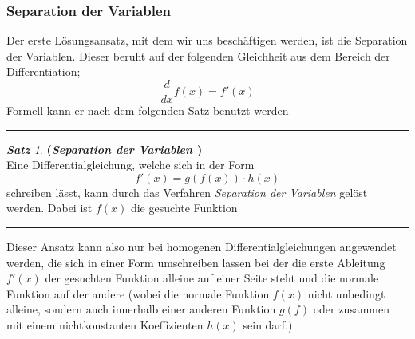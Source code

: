 \documentclass[a4paper,11pt]{article}
\theoremstyle{remark}
\newtheorem{sentence}{\textbf{Satz}}[section]
\begin{document}
\subsubsection{Separation der Variablen}
Der erste Lösungsansatz, mit dem wir uns beschäftigen werden, ist die Separation der Variablen. Dieser beruht auf der folgenden Gleichheit aus dem Bereich der Differentiation;
\begin{equation}
\frac{d}{dx}f(x)=f'(x)
\end{equation}
Formell kann er nach dem folgenden Satz benutzt werden
\begin{center}
\begin{flushleft}
\rule{8cm}{0,01cm}
\end{flushleft}
\begin{sentence}{\textbf{(\textit{Separation der Variablen \cite{2}})}} \\
Eine Differentialgleichung, welche sich in der Form 
\begin{equation}
f'(x)=g(f(x))\cdot h(x)
\end{equation}
schreiben lässt, kann durch das Verfahren \textit{Separation der Variablen} gelöst werden. Dabei ist $f(x)$ die gesuchte Funktion
\end{sentence}
\begin{flushleft}
\rule{8cm}{0,01cm}
\end{flushleft}
\end{center}
Dieser Ansatz kann also nur bei homogenen Differentialgleichungen angewendet werden, die sich in einer Form umschreiben lassen bei der die erste Ableitung $f'(x)$ der gesuchten Funktion alleine auf einer Seite steht und die normale Funktion auf der andere (wobei die normale Funktion $f(x)$ nicht unbedingt alleine, sondern auch innerhalb einer anderen Funktion $g(f)$ oder zusammen mit einem nichtkonstanten Koeffizienten $h(x)$ sein darf.)\\ \\ 
\end{document}
